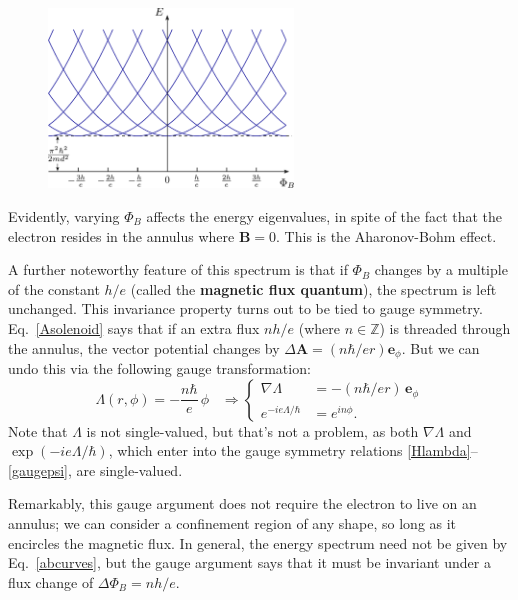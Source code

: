 \documentclass[prx,12pt]{revtex4-2}
\begin{document}
\begin{figure}[h]
  \centering\includegraphics[width=0.58\textwidth]{abring}
\end{figure}

Evidently, varying $\Phi_B$ affects the energy eigenvalues, in spite
of the fact that the electron resides in the annulus where $\mathbf{B}
= 0$.  This is the Aharonov-Bohm effect.

A further noteworthy feature of this spectrum is that if $\Phi_B$
changes by a multiple of the constant $h/e$ (called the
\textbf{magnetic flux quantum}), the spectrum is left unchanged.  This
invariance property turns out to be tied to gauge symmetry.
Eq.~\eqref{Asolenoid} says that if an extra flux $nh/e$ (where
$n\in\mathbb{Z}$) is threaded through the annulus, the vector
potential changes by $\Delta \mathbf{A} = (n\hbar/ e r)
\mathbf{e}_\phi$.  But we can undo this via the following gauge
transformation:
\begin{equation}
  \Lambda(r,\phi) = - \frac{n\hbar}{e} \, \phi \;\;\;\Rightarrow
  \begin{cases}\nabla \Lambda &= \displaystyle - (n\hbar/er) \, \mathbf{e}_\phi
    \\ \displaystyle e^{-ie\Lambda/\hbar} &= \displaystyle e^{in\phi}.
  \end{cases}
\end{equation}
Note that $\Lambda$ is not single-valued, but that's not a problem, as
both $\nabla\Lambda$ and $\exp(-ie\Lambda/\hbar)$, which enter into
the gauge symmetry relations \eqref{Hlambda}--\eqref{gaugepsi}, are
single-valued.

Remarkably, this gauge argument does not require the electron to live
on an annulus; we can consider a confinement region of any shape, so
long as it encircles the magnetic flux.  In general, the energy
spectrum need not be given by Eq.~\eqref{abcurves}, but the gauge
argument says that it must be invariant under a flux change of $\Delta
\Phi_B = n h/e$.
\end{document}
